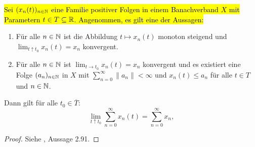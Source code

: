\begin{fsatz}\label{Majorisierte Konvergenz in Banachverbänden}
\hl{Sei $(x_n(t))_{n\in\mathbb{N}}$ eine Familie positiver Folgen in einem Banachverband $X$ mit Parametern $t\in T\subseteq \mathbb{R}$. Angenommen, es gilt eine der Aussagen:}
\begin{enumerate}
\item Für alle $n\in\mathbb{N}$ ist die Abbildung $t\mapsto x_n(t)$ monoton steigend und $\lim_{t\uparrow t_0}x_n(t) =  x_n$ konvergent.
\item Für alle $n\in\mathbb{N}$ ist $\lim_{t\to t_0} x_n(t)= x_n$ konvergent und es existiert eine Folge $(a_n)_{n\in\mathbb{N}}$ in $X$ mit $\sum_{n=0}^\infty \|a_n \|<\infty$ und $x_n(t)\leq a_n$ für alle $t\in T$ und $n\in \mathbb{N}$.
\end{enumerate}
Dann gilt für alle $t_0\in\overline T$:
\begin{equation*}
\lim_{t\uparrow t_0}\sum_{n=0}^\infty x_n(t) = \sum_{n=0}^\infty x_n,
\end{equation*}
\end{fsatz}



\begin{proof}
Siehe \cite{banasiak_arlotti_2006}, Aussage 2.91.
\end{proof}


